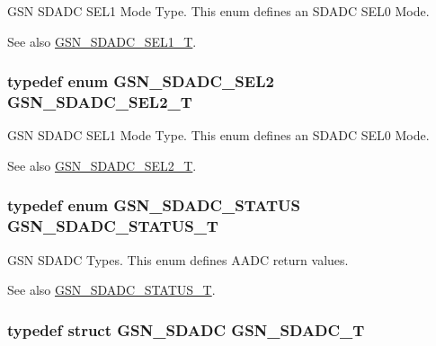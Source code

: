 GSN SDADC SEL1 Mode Type. This enum defines an SDADC SEL0 Mode. 

\begin{DoxySeeAlso}{See also}
\hyperlink{a00652_ga851e1269993bbdc128b392fd7216ade7}{GSN\_\-SDADC\_\-SEL1\_\-T}. 
\end{DoxySeeAlso}
\hypertarget{a00652_ga21776f699fb060e738c464107e435df4}{
\subsubsection[{GSN\_\-SDADC\_\-SEL2\_\-T}]{\setlength{\rightskip}{0pt plus 5cm}typedef enum {\bf GSN\_\-SDADC\_\-SEL2}  {\bf GSN\_\-SDADC\_\-SEL2\_\-T}}}
\label{a00652_ga21776f699fb060e738c464107e435df4}


GSN SDADC SEL1 Mode Type. This enum defines an SDADC SEL0 Mode. 

\begin{DoxySeeAlso}{See also}
\hyperlink{a00652_ga21776f699fb060e738c464107e435df4}{GSN\_\-SDADC\_\-SEL2\_\-T}. 
\end{DoxySeeAlso}
\hypertarget{a00652_ga36cbafd55d35763f491d3ba72f61ca51}{
\subsubsection[{GSN\_\-SDADC\_\-STATUS\_\-T}]{\setlength{\rightskip}{0pt plus 5cm}typedef enum {\bf GSN\_\-SDADC\_\-STATUS}  {\bf GSN\_\-SDADC\_\-STATUS\_\-T}}}
\label{a00652_ga36cbafd55d35763f491d3ba72f61ca51}


GSN SDADC Types. This enum defines AADC return values. 

\begin{DoxySeeAlso}{See also}
\hyperlink{a00652_ga36cbafd55d35763f491d3ba72f61ca51}{GSN\_\-SDADC\_\-STATUS\_\-T}. 
\end{DoxySeeAlso}
\hypertarget{a00652_ga24812a09f6831a451bf951bbc956b2b9}{
\subsubsection[{GSN\_\-SDADC\_\-T}]{\setlength{\rightskip}{0pt plus 5cm}typedef struct {\bf GSN\_\-SDADC}  {\bf GSN\_\-SDADC\_\-T}}}
\label{a00652_ga24812a09f6831a451bf951bbc956b2b9}



